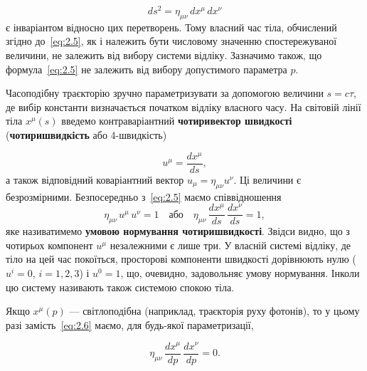 \begin{equation*}
  ds^2 = \eta_{\mu\nu}\,dx^\mu\,dx^\nu
\end{equation*}
є інваріантом відносно цих перетворень. Тому власний час тіла, обчислений згідно до~\eqref{eq:2.5}, як і належить бути
числовому значенню спостережуваної величини, не залежить від вибору системи відліку. Зазначимо також, що
формула~\eqref{eq:2.5} не залежить від вибору допустимого параметра $p$.

Часоподібну траєкторію зручно параметризувати за допомогою величини $s = c\tau$, де вибір константи визначається
початком відліку власного часу. На світовій лінії тіла $x^\mu(s)$ введемо контраваріантний \textbf{чотиривектор
швидкості} (\textbf{чотиришвидкість} або 4-швидкість)

\begin{equation*}
  u^\mu = \frac{dx^\mu}{ds},
\end{equation*}
а також відповідний коваріантний вектор $u_\mu = \eta_{\mu\nu}u^\nu$. Ці величини є безрозмірними. Безпосередньо
з~\eqref{eq:2.5} маємо співвідношення
\begin{equation}\label{eq:2.6}
  \eta_{\mu\nu}\,u^\mu\, u^\nu = 1
  \quad\text{або}\quad
  \eta_{\mu\nu}\,\frac{dx^\mu}{ds}\,\frac{dx^\nu}{ds} = 1,
\end{equation}
яке називатимемо \textbf{умовою нормування чотиришвидкості}. Звідси видно, що з чотирьох компонент $u^\mu$ незалежними є
лише три. У власній системі відліку, де тіло на цей час покоїться, просторові компоненти швидкості дорівнюють нулю ($u^i
= 0$, $i=1,2,3$) і $u^0 = 1$, що, очевидно, задовольняє умову нормування. Інколи цю систему називають також системою
спокою тіла.

Якщо $x^\mu(p)$ --- світлоподібна (наприклад, траєкторія руху фотонів), то у цьому разі замість~\eqref{eq:2.6} маємо,
для будь-якої параметризації,

\begin{equation*}
  \eta_{\mu\nu}\,\frac{dx^\mu}{dp}\,\frac{dx^\nu}{dp} = 0.
\end{equation*}

